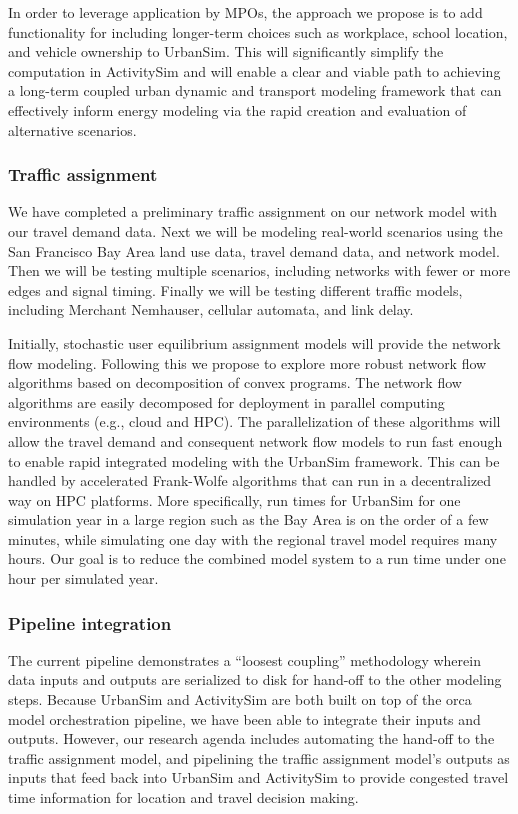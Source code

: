 In order to leverage application by MPOs, the approach we propose is to add functionality for including longer-term choices such as workplace, school location, and vehicle ownership to UrbanSim. This will significantly simplify the computation in ActivitySim and will enable a clear and viable path to achieving a long-term coupled urban dynamic and transport modeling framework that can effectively inform energy modeling via the rapid creation and evaluation of alternative scenarios. 

\subsubsection{Traffic assignment}

We have completed a preliminary traffic assignment on our network model with our travel demand data. Next we will be modeling real-world scenarios using the San Francisco Bay Area land use data, travel demand data, and network model. Then we will be testing multiple scenarios, including networks with fewer or more edges and signal timing. Finally we will be testing different traffic models, including Merchant Nemhauser, cellular automata, and link delay.

Initially, stochastic user equilibrium assignment models will provide the network flow modeling. Following this we propose to explore more robust network flow algorithms based on decomposition of convex programs. The network flow algorithms are easily decomposed for deployment in parallel computing environments (e.g., cloud and HPC). The parallelization of these algorithms will allow the travel demand and consequent network flow models to run fast enough to enable rapid integrated modeling with the UrbanSim framework. This can be handled by accelerated Frank-Wolfe algorithms that can run in a decentralized way on HPC platforms. More specifically, run times for UrbanSim for one simulation year in a large region such as the Bay Area is on the order of a few minutes, while simulating one day with the regional travel model requires many hours. Our goal is to reduce the combined model system to a run time under one hour per simulated year.

\subsubsection{Pipeline integration}

The current pipeline demonstrates a \enquote{loosest coupling} methodology wherein data inputs and outputs are serialized to disk for hand-off to the other modeling steps. Because UrbanSim and ActivitySim are both built on top of the orca model orchestration pipeline, we have been able to integrate their inputs and outputs. However, our research agenda includes automating the hand-off to the traffic assignment model, and pipelining the traffic assignment model's outputs as inputs that feed back into UrbanSim and ActivitySim to provide congested travel time information for location and travel decision making.

